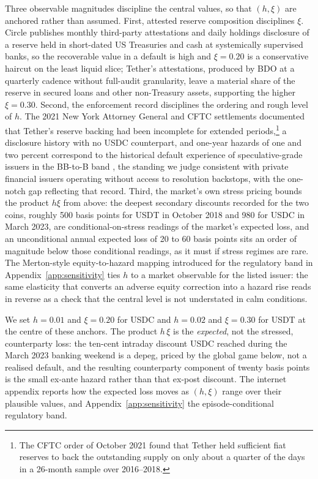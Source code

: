 Three observable magnitudes discipline the central values, so that $(h, \xi)$ are anchored rather than assumed. First, attested reserve composition disciplines $\xi$. Circle publishes monthly third-party attestations and daily holdings disclosure of a reserve held in short-dated US Treasuries and cash at systemically supervised banks, so the recoverable value in a default is high and $\xi = 0.20$ is a conservative haircut on the least liquid slice; Tether's attestations, produced by BDO at a quarterly cadence without full-audit granularity, leave a material share of the reserve in secured loans and other non-Treasury assets, supporting the higher $\xi = 0.30$. Second, the enforcement record disciplines the ordering and rough level of $h$. The 2021 New York Attorney General and CFTC settlements documented that Tether's reserve backing had been incomplete for extended periods,\footnote{The CFTC order of October 2021 found that Tether held sufficient fiat reserves to back the outstanding supply on only about a quarter of the days in a 26-month sample over 2016--2018.} a disclosure history with no USDC counterpart, and one-year hazards of one and two percent correspond to the historical default experience of speculative-grade issuers in the BB-to-B band \citep{sp_default_study_2025}, the standing we judge consistent with private financial issuers operating without access to resolution backstops, with the one-notch gap reflecting that record. Third, the market's own stress pricing bounds the product $h\xi$ from above: the deepest secondary discounts recorded for the two coins, roughly 500 basis points for USDT in October 2018 \citep{lyons_viswanath_natraj_2023} and 980 for USDC in March 2023, are conditional-on-stress readings of the market's expected loss, and an unconditional annual expected loss of 20 to 60 basis points sits an order of magnitude below those conditional readings, as it must if stress regimes are rare. The Merton-style equity-to-hazard mapping introduced for the regulatory band in Appendix~\ref{app:sensitivity} ties $h$ to a market observable for the listed issuer: the same elasticity that converts an adverse equity correction into a hazard rise reads in reverse as a check that the central level is not understated in calm conditions.

We set $h=0.01$ and $\xi=0.20$ for USDC and $h=0.02$ and $\xi=0.30$ for USDT at the centre of these anchors. The product $h\,\xi$ is the \emph{expected}, not the stressed, counterparty loss: the ten-cent intraday discount USDC reached during the March 2023 banking weekend is a depeg, priced by the global game below, not a realised default, and the resulting counterparty component of twenty basis points is the small ex-ante hazard rather than that ex-post discount. The internet appendix reports how the expected loss moves as $(h,\xi)$ range over their plausible values, and Appendix~\ref{app:sensitivity} the episode-conditional regulatory band.

